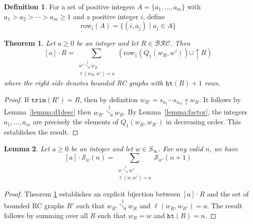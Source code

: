 \documentclass{amsart}
\newtheorem{lemma}{Lemma}[subsection]
\newtheorem{theorem}{Theorem}[section]
\theoremstyle{definition}
\newtheorem{definition}[lemma]{Definition}
\theoremstyle{remark}
\numberwithin{equation}{subsection}
\newcommand{\shup}{{\uparrow}}
\newcommand{\downvar}[1]{\stackrel{#1}{\searrow}}
\newcommand{\wof}[1]{w_{#1}}
\newcommand{\trm}{\mathtt{trim}}
\newcommand{\hr}{\mathtt{ht}}
\newcommand{\BRC}{\mathcal{BRC}}
\begin{document}
\begin{definition}
For a set of positive integers $A=\{a_1,\ldots, a_m\}$ with $a_1>a_2>\cdots > a_m\geq 1$ and a positive integer $i$, define
$$\mathrm{row}_i(A) = \{(i, a_j) \mid a_j\in A\}$$
\end{definition}

\begin{theorem} \label{theorem:modactrc}
Let $a\geq 0$ be an integer and let $R\in \BRC$. Then
$$[a]\cdot R = \sum_{\substack{w'\downvar{1}\wof{R}\\\ell(\wof{R},w')=a}} \left(\mathrm{row}_1(Q_1(\wof{R},w'))\cup \shup{R}\right)$$
where the right side denotes bounded RC graphs with $\hr(R)+1$ rows.
\end{theorem}
\begin{proof}
	If $\trm(R') = R$, then by definition $\wof{R'} = s_{a_1}\cdots s_{a_m}\shup \wof{R}$. It follows by Lemma~\ref{lemma:d1desc} then $\wof{R'}\downvar{1}\wof{R}$. By Lemma~\ref{lemma:factor}, the integers $a_1,\ldots, a_m$ are precisely the elements of $Q_1(\wof{R},\wof{R'})$ in decreasing order. This establishes the result.
\end{proof}


\begin{lemma} \label{lemma:drcpieri}
	Let $a\geq 0$ be an integer and let $w\in S_\infty$. For any valid $n$, we have
	$$[a]\cdot \mathcal{S}_w(n) = \sum_{\substack{w\downvar{1} w'\\\ell(w,w')=a}} \mathcal{S}_{w'}(n+1)$$
\end{lemma}
\begin{proof}
Theorem \ref{theorem:modactrc} establishes an explicit bijection between $[a]\cdot R$ and the set of bounded RC graphs $R'$ such that $\wof{R'}\downvar{1}\wof{R}$ and $\ell(\wof{R},\wof{R'})=a$. The result follows by summing over all $R$ such that $\wof{R}=w$ and $\hr(R)=n$.
\end{proof}
\end{document}
